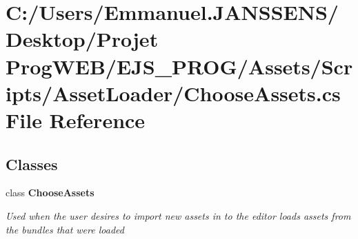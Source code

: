 \section{C\+:/\+Users/\+Emmanuel.J\+A\+N\+S\+S\+E\+N\+S/\+Desktop/\+Projet Prog\+W\+E\+B/\+E\+J\+S\+\_\+\+P\+R\+O\+G/\+Assets/\+Scripts/\+Asset\+Loader/\+Choose\+Assets.cs File Reference}
\label{_choose_assets_8cs}
\subsection*{Classes}
\begin{DoxyCompactItemize}
\item 
class \textbf{ Choose\+Assets}
\begin{DoxyCompactList}\small\item\em Used when the user desires to import new assets in to the editor loads assets from the bundles that were loaded \end{DoxyCompactList}\end{DoxyCompactItemize}
